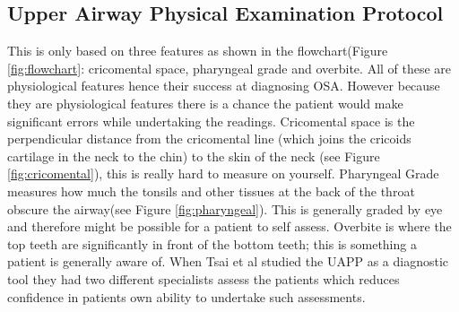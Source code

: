 \subsection{Upper Airway Physical Examination Protocol}
This is only based on three features as shown in the flowchart(Figure \ref{fig:flowchart}: cricomental space, pharyngeal grade and overbite. All of these are physiological features hence their success at diagnosing OSA. However because they are physiological features there is a chance the patient would make significant errors while undertaking the readings. Cricomental space is the perpendicular distance from the cricomental line (which joins the cricoids cartilage in the neck to the chin) to the skin of the neck (see Figure \ref{fig:cricomental}), this is really hard to measure on yourself. Pharyngeal Grade measures how much the tonsils and other tissues at the back of the throat obscure the airway(see Figure \ref{fig:pharyngeal}). This is generally graded by eye and therefore might be possible for a patient to self assess. Overbite is where the top teeth are significantly in front of the bottom teeth; this is something a patient is generally aware of. When Tsai et al studied the UAPP as a diagnostic tool they had two different specialists assess the patients which reduces confidence in patients own ability to undertake such assessments. 

